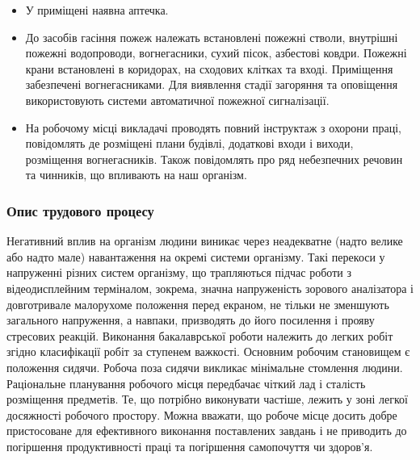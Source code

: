 \documentclass[12pt,a4paper]{article}
\begin{document}
\begin{itemize}
  \item У приміщені наявна аптечка. 
  \item До засобів гасіння пожеж належать встановлені пожежні стволи, внутрішні пожежні водопроводи, вогнегасники, сухий пісок, азбестові ковдри. Пожежні крани встановлені в коридорах, на сходових клітках та вході. Приміщення забезпечені вогнегасниками. Для виявлення стадії загоряння та оповіщення використовують системи автоматичної пожежної сигналізації.
  \item На робочому місці викладачі проводять повний інструктаж з  охорони праці, повідомлять де розміщені плани будівлі, додаткові входи і виходи, розміщення вогнегасників. Також повідомлять про ряд небезпечних речовин та чинників, що впливають на наш організм.
\end{itemize}
\subsubsection{Опис трудового процесу} 
Негативний вплив на організм людини виникає через неадекватне (надто велике або надто мале) навантаження на окремі системи організму. Такі перекоси у напруженні різних систем організму, що трапляються підчас роботи з відеодисплейним терміналом, зокрема, значна напруженість зорового аналізатора і довготривале малорухоме положення перед екраном, не тільки не зменшують загального напруження, а навпаки, призводять до його посилення і прояву стресових реакцій.
Виконання бакалаврської роботи належить до легких робіт згідно класифікації робіт за ступенем важкості.
Основним робочим становищем є положення сидячи. Робоча поза сидячи викликає мінімальне стомлення людини. Раціональне планування робочого місця передбачає чіткий лад і сталість розміщення предметів. Те, що потрібно виконувати частіше, лежить у зоні легкої досяжності робочого простору. 
Можна вважати, що робоче місце досить добре пристосоване для ефективного виконання поставлених завдань і не приводить до погіршення продуктивності праці та погіршення самопочуття чи здоров’я.
\end{document}
